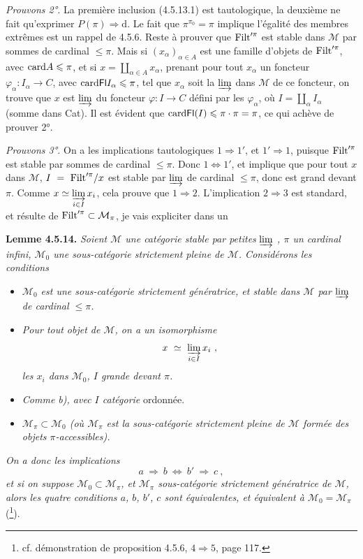 \textit{Prouvons 2°.} La première inclusion (4.5.13.1) est tautologique, la deuxième ne fait qu'exprimer $P(\pi) \Longrightarrow \mathrm{d}$. Le fait que $\pi^{\pi_0} = \pi$ implique l'égalité des membres extrêmes est un rappel de 4.5.6. Reste à prouver que $\mathrm{Filt}'^{\pi}$ est stable dans $\mathcal{M}$ par sommes de cardinal $\leqslant \pi$. Mais si $(x_{\alpha})_{\alpha\in A}$ est une famille d'objets de $\mathrm{Filt}'^{\pi}$, avec $\mathrm{card} A \leqslant \pi$, et si $x = \coprod_{\alpha\in A} x_{\alpha}$, prenant pour tout $x_{\alpha}$ un foncteur $\varphi_{\alpha} : I_{\alpha} \longrightarrow C$, avec $\mathrm{card} \mathsf{Fl} I_{\alpha} \leqslant \pi$, tel que $x_{\alpha}$ soit la $\varinjlim$ dans $\mathcal{M}$ de ce foncteur, on trouve que $x$ est $\varinjlim$ du foncteur $\varphi : I \longrightarrow C$ défini par les $\varphi_{\alpha}$, où $I = \coprod_{\alpha} I_{\alpha}$ (somme dans Cat). Il est évident que $\mathrm{card} \mathsf{Fl}(I) \leqslant \pi\cdot\pi = \pi$, ce qui achève de prouver 2°.

\textit{Prouvons 3°.} On a les implications tautologiques $1 \Longrightarrow 1'$, et $1' \Longrightarrow 1$, puisque $\mathrm{Filt}'^{\pi}$ est stable par sommes de cardinal $\leqslant \pi$. Donc $1 \Longleftrightarrow 1'$, et implique que pour tout $x$ dans $\mathcal{M}$,
$I \ = \ \mathrm{Filt}'^{\pi}/x$ est stable par $\varinjlim$ de cardinal $\leqslant \pi$, donc est grand devant $\pi$. Comme $x \simeq \varinjlim\limits_{i\in I} x_i$, cela prouve que $1 \Longrightarrow 2$. L'implication $2 \Longrightarrow 3$ est standard, et résulte de $\mathrm{Filt}'^{\pi} \subset \mathcal{M}_{\pi}$, je vais expliciter dans un

\textbf{Lemme 4.5.14.} \textit{Soient $\mathcal{M}$ une catégorie stable par petites} $\varinjlim$ \textit{, $\pi$ un cardinal infini, $\mathcal{M}_0$ une sous-catégorie strictement pleine de $\mathcal{M}$. Considérons les conditions}
\begin{itemize}
\item[\textit{a)}] \textit{$\mathcal{M}_0$ est une sous-catégorie strictement génératrice, et stable dans $\mathcal{M}$ par} $\varinjlim$ \textit{de cardinal $\leqslant \pi$.}
\item[\textit{b)}] \textit{Pour tout objet de $\mathcal{M}$, on a un isomorphisme}
\[ x \ \simeq \ \varinjlim_{i\in I} x_i \ , \]
\textit{les $x_i$ dans $\mathcal{M}_0$, $I$ grande devant $\pi$.}

\item[\textit{b$'$)}] \textit{Comme b), avec $I$ catégorie} ordonnée.
\item[\textit{c)}] \textit{$\mathcal{M}_{\pi} \subset \mathcal{M}_0$ (où $\mathcal{M}_{\pi}$ est la sous-catégorie strictement pleine de $\mathcal{M}$ formée des objets $\pi$-accessibles).}
\end{itemize}
\textit{On a donc les implications}
\[ a \ \Longrightarrow \ b \ \Longleftrightarrow \ b' \ \Longrightarrow \ c \ , \]
\textit{et si on suppose $\mathcal{M}_0 \subset \mathcal{M}_{\pi}$, et $\mathcal{M}_{\pi}$ sous-catégorie strictement génératrice de $\mathcal{M}$, alors les quatre conditions $a$, $b$, $b'$, $c$ sont équivalentes, et équivalent à $\mathcal{M}_0 = \mathcal{M}_{\pi}$} (\footnote{cf. démonstration de proposition 4.5.6, $4 \Longrightarrow 5$, page 117.}).

